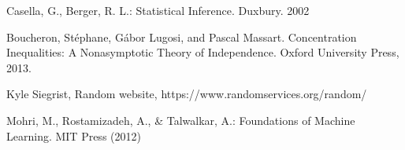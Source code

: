 \begin{thebibliography}{9}

Casella, G., Berger, R. L.: Statistical Inference. Duxbury. 2002

Boucheron, Stéphane, Gábor Lugosi, and Pascal Massart. Concentration Inequalities: A Nonasymptotic Theory of Independence. Oxford University Press, 2013.

 Kyle Siegrist, Random website, https://www.randomservices.org/random/

Mohri, M., Rostamizadeh, A., \& Talwalkar, A.: Foundations of Machine Learning. MIT Press (2012)

\end{thebibliography}

